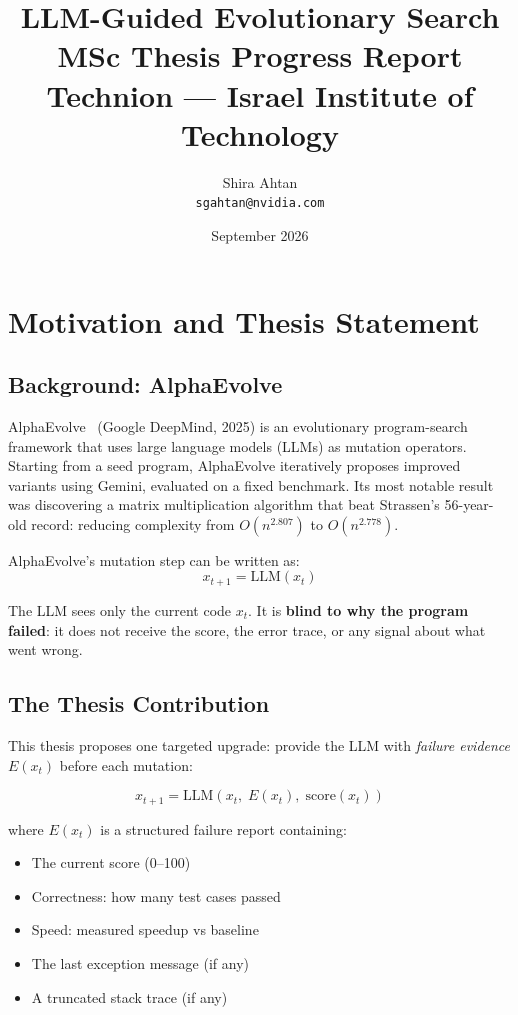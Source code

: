 \documentclass[11pt,a4paper]{article}
\title{
  \textbf{LLM-Guided Evolutionary Search} \\[0.4em]
  \large MSc Thesis Progress Report \\[0.2em]
  \normalsize Technion --- Israel Institute of Technology
}
\author{Shira Ahtan \\ \texttt{sgahtan@nvidia.com}}
\date{September 2026}
\begin{document}
\maketitle
\tableofcontents
\newpage

\section{Motivation and Thesis Statement}

\subsection{Background: AlphaEvolve}

AlphaEvolve~\cite{alphaevolve2025} (Google DeepMind, 2025) is an evolutionary
program-search framework that uses large language models (LLMs) as mutation
operators. Starting from a seed program, AlphaEvolve iteratively proposes
improved variants using Gemini, evaluated on a fixed benchmark. Its most
notable result was discovering a matrix multiplication algorithm that beat
Strassen's 56-year-old record: reducing complexity from $O(n^{2.807})$ to
$O(n^{2.778})$.

AlphaEvolve's mutation step can be written as:
\[
  x_{t+1} = \mathrm{LLM}(x_t)
\]

The LLM sees only the current code $x_t$. It is \textbf{blind to why the
program failed}: it does not receive the score, the error trace, or any
signal about what went wrong.

\subsection{The Thesis Contribution}

This thesis proposes one targeted upgrade: provide the LLM with \emph{failure
evidence} $E(x_t)$ before each mutation:

\[
  \boxed{x_{t+1} = \mathrm{LLM}\!\left(x_t,\; E(x_t),\; \mathrm{score}(x_t)\right)}
\]

where $E(x_t)$ is a structured failure report containing:
\begin{itemize}
  \item The current score (0--100)
  \item Correctness: how many test cases passed
  \item Speed: measured speedup vs baseline
  \item The last exception message (if any)
  \item A truncated stack trace (if any)
\end{itemize}
\end{document}
